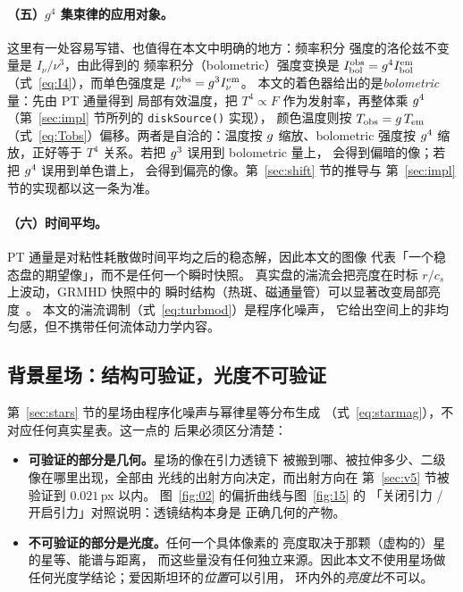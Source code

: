 \paragraph{（五）$g^{4}$ 集束律的应用对象。}
这里有一处容易写错、也值得在本文中明确的地方：频率积分
强度的洛伦兹不变量是 $I_\nu/\nu^3$，由此得到的
频率积分（bolometric）强度变换是
$I_{\rm bol}^{\rm obs}=g^{4}I_{\rm bol}^{\rm em}$
（式~\eqref{eq:I4}），而单色强度是
$I_\nu^{\rm obs}=g^{3}I_\nu^{\rm em}$。
本文的着色器给出的是\emph{bolometric} 量：先由 PT 通量得到
局部有效温度，把 $T^4\propto F$ 作为发射率，再整体乘 $g^{4}$
（第~\ref{sec:impl} 节所列的 \texttt{diskSource()} 实现），
颜色温度则按 $T_{\rm obs}=g\,T_{\rm em}$
（式~\eqref{eq:Tobs}）偏移。两者是自洽的：温度按 $g$
缩放、bolometric 强度按 $g^4$ 缩放，正好等于
$T^4$ 关系。若把 $g^3$ 误用到 bolometric 量上，
会得到偏暗的像；若把 $g^4$ 误用到单色谱上，
会得到偏亮的像。第~\ref{sec:shift} 节的推导与
第~\ref{sec:impl} 节的实现都以这一条为准。

\paragraph{（六）时间平均。}
PT 通量是对粘性耗散做时间平均之后的稳态解，因此本文的图像
代表「一个稳态盘的期望像」，而不是任何一个瞬时快照。
真实盘的湍流会把亮度在时标 $r/c_s$ 上波动，GRMHD 快照中的
瞬时结构（热斑、磁通量管）可以显著改变局部亮度~\cite{koral2013,ipole2016}。
本文的湍流调制（式~\eqref{eq:turbmod}）是程序化噪声，
它给出空间上的非均匀感，但不携带任何流体动力学内容。

\subsection{背景星场：结构可验证，光度不可验证}\label{sec:discuss-stars}

第~\ref{sec:stars} 节的星场由程序化噪声与幂律星等分布生成
（式~\eqref{eq:starmag}），不对应任何真实星表。这一点的
后果必须区分清楚：

\begin{itemize}[leftmargin=1.6em,itemsep=1pt,topsep=3pt]
  \item \textbf{可验证的部分是几何。}星场的像在引力透镜下
        被搬到哪、被拉伸多少、二级像在哪里出现，全部由
        光线的出射方向决定，而出射方向在
        第~\ref{sec:v5} 节被验证到 $0.021$\,px 以内。
        图~\ref{fig:02} 的偏折曲线与图~\ref{fig:15} 的
        「关闭引力 / 开启引力」对照说明：透镜结构本身是
        正确几何的产物。
  \item \textbf{不可验证的部分是光度。}任何一个具体像素的
        亮度取决于那颗（虚构的）星的星等、能谱与距离，
        而这些量没有任何独立来源。因此本文不使用星场做
        任何光度学结论；爱因斯坦环的\emph{位置}可以引用，
        环内外的\emph{亮度比}不可以。
\end{itemize}

